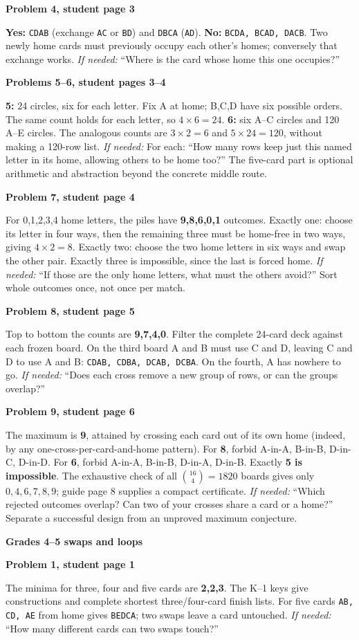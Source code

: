 \documentclass[11pt]{article}
\newcommand{\head}[1]{\par\textbf{\large #1}\par}
\newcommand{\sub}[1]{\par\textbf{#1}\par}
\newcommand{\row}[1]{\texttt{#1}}
\newcommand{\hint}[1]{\emph{If needed:} #1}
\begin{document}
\sub{Problem 4, student page 3}
\textbf{Yes:} \row{CDAB} (exchange \row{AC} or \row{BD}) and \row{DBCA} (\row{AD}). \textbf{No:} \row{BCDA, BCAD, DACB}. Two newly home cards must previously occupy each other's homes; conversely that exchange works. \hint{``Where is the card whose home this one occupies?''}

\sub{Problems 5--6, student pages 3--4}
\textbf{5:} 24 circles, six for each letter. Fix A at home; B,C,D have six possible orders. The same count holds for each letter, so $4\times6=24$. \textbf{6:} six A--C circles and 120 A--E circles. The analogous counts are $3\times2=6$ and $5\times24=120$, without making a 120-row list. \hint{For each: ``How many rows keep just this named letter in its home, allowing others to be home too?''} The five-card part is optional arithmetic and abstraction beyond the concrete middle route.

\sub{Problem 7, student page 4}
For 0,1,2,3,4 home letters, the piles have \textbf{9,8,6,0,1} outcomes. Exactly one: choose its letter in four ways, then the remaining three must be home-free in two ways, giving $4\times2=8$. Exactly two: choose the two home letters in six ways and swap the other pair. Exactly three is impossible, since the last is forced home. \hint{``If those are the only home letters, what must the others avoid?''} Sort whole outcomes once, not once per match.

\sub{Problem 8, student page 5}
Top to bottom the counts are \textbf{9,7,4,0}. Filter the complete 24-card deck against each frozen board. On the third board A and B must use C and D, leaving C and D to use A and B: \row{CDAB, CDBA, DCAB, DCBA}. On the fourth, A has nowhere to go. \hint{``Does each cross remove a new group of rows, or can the groups overlap?''}

\sub{Problem 9, student page 6}
The maximum is \textbf{9}, attained by crossing each card out of its own home (indeed, by any one-cross-per-card-and-home pattern). For \textbf{8}, forbid A-in-A, B-in-B, D-in-C, D-in-D. For \textbf{6}, forbid A-in-A, B-in-B, D-in-A, D-in-B. Exactly \textbf{5 is impossible}. The exhaustive check of all $\binom{16}{4}=1820$ boards gives only $0,4,6,7,8,9$; guide page 8 supplies a compact certificate. \hint{``Which rejected outcomes overlap? Can two of your crosses share a card or a home?''} Separate a successful design from an unproved maximum conjecture.
\newpage
\head{Grades 4--5 swaps and loops}
\sub{Problem 1, student page 1}
The minima for three, four and five cards are \textbf{2,2,3}. The K--1 keys give constructions and complete shortest three/four-card finish lists. For five cards \row{AB, CD, AE} from home gives \row{BEDCA}; two swaps leave a card untouched. \hint{``How many different cards can two swaps touch?''}
\end{document}
